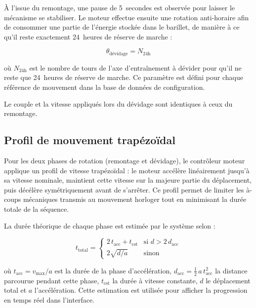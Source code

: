 À l'issue du remontage, une pause de 5~secondes est observée pour laisser
le mécanisme se stabiliser. Le moteur effectue ensuite une rotation
anti-horaire afin de consommer une partie de l'énergie stockée dans le
barillet, de manière à ce qu'il reste exactement 24~heures de réserve de
marche :

\begin{equation}
    \theta_{\text{dévidage}} = N_{24\text{h}}
    \label{eq:devidage}
\end{equation}

où $N_{24\text{h}}$ est le nombre de tours de l'axe d'entraînement à
dévider pour qu'il ne reste que 24~heures de réserve de marche.
Ce paramètre est défini pour chaque référence de mouvement dans la base
de données de configuration.

Le couple et la vitesse appliqués lors du dévidage sont identiques à ceux
du remontage.

\subsection{Profil de mouvement trapézoïdal}

Pour les deux phases de rotation (remontage et dévidage), le contrôleur
moteur applique un profil de vitesse trapézoïdal : le moteur accélère
linéairement jusqu'à sa vitesse nominale, maintient cette vitesse sur la
majeure partie du déplacement, puis décélère symétriquement avant de
s'arrêter. Ce profil permet de limiter les à-coups mécaniques transmis
au mouvement horloger tout en minimisant la durée totale de la séquence.

La durée théorique de chaque phase est estimée par le système selon :

\begin{equation}
    t_{\text{total}} =
    \begin{cases}
        2\,t_{\text{acc}} + t_{\text{cst}}
            & \text{si } d > 2\,d_{\text{acc}} \\[4pt]
        2\sqrt{d / a}
            & \text{sinon}
    \end{cases}
    \label{eq:trapeze}
\end{equation}

où $t_{\text{acc}} = v_{\text{max}} / a$ est la durée de la phase
d'accélération, $d_{\text{acc}} = \tfrac{1}{2}\,a\,t_{\text{acc}}^2$
la distance parcourue pendant cette phase, $t_{\text{cst}}$ la durée
à vitesse constante, $d$ le déplacement total et $a$ l'accélération.
Cette estimation est utilisée pour afficher la progression en temps réel
dans l'interface.

